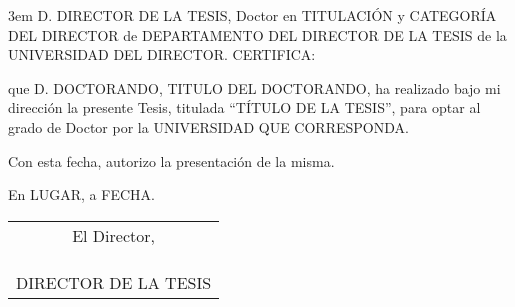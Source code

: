 \cleardoublepage
\thispagestyle{empty}
\hfill\begin{minipage}[t]{0.85\textwidth}\parindent 3em
D. DIRECTOR DE LA TESIS, Doctor en TITULACIÓN y CATEGORÍA DEL DIRECTOR de
DEPARTAMENTO DEL DIRECTOR DE LA TESIS de la UNIVERSIDAD DEL DIRECTOR.
\null\vspace{\baselineskip}
CERTIFICA:

\vspace{\baselineskip}
que D. DOCTORANDO, TITULO DEL DOCTORANDO, ha realizado bajo mi
dirección la presente Tesis, titulada ``TÍTULO DE LA TESIS'', para optar al
grado de Doctor por la UNIVERSIDAD QUE CORRESPONDA.

\vspace{\baselineskip}
Con esta fecha, autorizo la presentación de la misma.

\vspace{\baselineskip}
\hfill En LUGAR, a FECHA.
\end{minipage}

\vspace{\baselineskip}
\hfill\begin{tabular}{c}
El Director, \\\\\\\\
DIRECTOR DE LA TESIS
\end{tabular}
